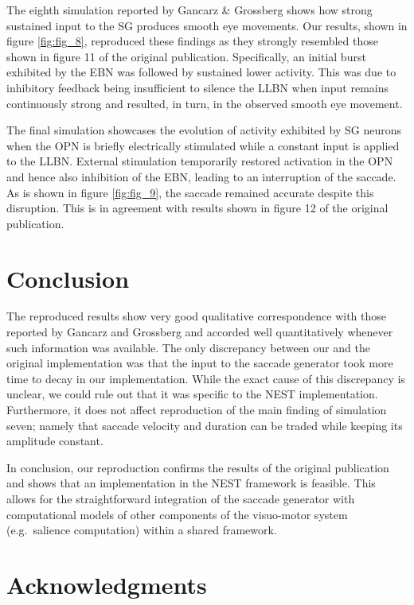 \documentclass[10pt,a4paper,onecolumn]{article}
\begin{document}
The eighth simulation reported by Gancarz \& Grossberg
\autocite{Gancarz1998} shows how strong sustained input to the SG
produces smooth eye movements. Our results, shown in figure
\ref{fig:fig_8}, reproduced these findings as they strongly resembled
those shown in figure 11 of the original publication. Specifically, an
initial burst exhibited by the EBN was followed by sustained lower
activity. This was due to inhibitory feedback being insufficient to
silence the LLBN when input remains continuously strong and resulted, in
turn, in the observed smooth eye movement.

The final simulation showcases the evolution of activity exhibited by SG
neurons when the OPN is briefly electrically stimulated while a constant
input is applied to the LLBN. External stimulation temporarily restored
activation in the OPN and hence also inhibition of the EBN, leading to
an interruption of the saccade. As is shown in figure \ref{fig:fig_9},
the saccade remained accurate despite this disruption. This is in
agreement with results shown in figure 12 of the original publication.

\section{Conclusion}\label{conclusion}

The reproduced results show very good qualitative correspondence with
those reported by Gancarz and Grossberg \autocite{Gancarz1998} and
accorded well quantitatively whenever such information was available.
The only discrepancy between our and the original implementation was
that the input to the saccade generator took more time to decay in our
implementation. While the exact cause of this discrepancy is unclear, we
could rule out that it was specific to the NEST implementation.
Furthermore, it does not affect reproduction of the main finding of
simulation seven; namely that saccade velocity and duration can be
traded while keeping its amplitude constant.

In conclusion, our reproduction confirms the results of the original
publication and shows that an implementation in the NEST framework is
feasible. This allows for the straightforward integration of the saccade
generator with computational models of other components of the
visuo-motor system (e.g.~salience computation) within a shared
framework.

\section{Acknowledgments}\label{acknowledgments}
\end{document}
